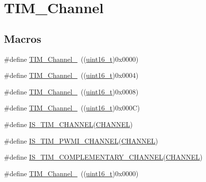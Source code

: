 \hypertarget{group___t_i_m___channel}{}\section{T\+I\+M\+\_\+\+Channel}
\label{group___t_i_m___channel}
\subsection*{Macros}
\begin{DoxyCompactItemize}
\item 
\#define \hyperlink{group___t_i_m___channel_ga69ea7f558f02c63dd1082d784d2449bd}{T\+I\+M\+\_\+\+Channel\+\_}~((\hyperlink{_p_e___types_8h_a1f1825b69244eb3ad2c7165ddc99c956}{uint16\+\_\+t})0x0000)
\item 
\#define \hyperlink{group___t_i_m___channel_ga03d7da8269a87a560f68985b4bd80931}{T\+I\+M\+\_\+\+Channel\+\_}~((\hyperlink{_p_e___types_8h_a1f1825b69244eb3ad2c7165ddc99c956}{uint16\+\_\+t})0x0004)
\item 
\#define \hyperlink{group___t_i_m___channel_ga012711b19e8c91f6f352801a3dc0bcc9}{T\+I\+M\+\_\+\+Channel\+\_}~((\hyperlink{_p_e___types_8h_a1f1825b69244eb3ad2c7165ddc99c956}{uint16\+\_\+t})0x0008)
\item 
\#define \hyperlink{group___t_i_m___channel_ga7414888c40d066af235bc1f80b99bd9d}{T\+I\+M\+\_\+\+Channel\+\_}~((\hyperlink{_p_e___types_8h_a1f1825b69244eb3ad2c7165ddc99c956}{uint16\+\_\+t})0x000\+C)
\item 
\#define \hyperlink{group___t_i_m___channel_gae9721e3731e5fd983c83a9c1d32ef03d}{I\+S\+\_\+\+T\+I\+M\+\_\+\+C\+H\+A\+N\+N\+EL}(\hyperlink{samr21__xpro_200std__low__power__mode_200std__low__power__mode_8c_ace6a11e892466500d47d1f45f042bc53}{C\+H\+A\+N\+N\+EL})
\item 
\#define \hyperlink{group___t_i_m___channel_gacbf272b7a14f63b38bdbf18577835dce}{I\+S\+\_\+\+T\+I\+M\+\_\+\+P\+W\+M\+I\+\_\+\+C\+H\+A\+N\+N\+EL}(\hyperlink{samr21__xpro_200std__low__power__mode_200std__low__power__mode_8c_ace6a11e892466500d47d1f45f042bc53}{C\+H\+A\+N\+N\+EL})
\item 
\#define \hyperlink{group___t_i_m___channel_ga6f44459b7dfc4138bbc2c3795311c48c}{I\+S\+\_\+\+T\+I\+M\+\_\+\+C\+O\+M\+P\+L\+E\+M\+E\+N\+T\+A\+R\+Y\+\_\+\+C\+H\+A\+N\+N\+EL}(\hyperlink{samr21__xpro_200std__low__power__mode_200std__low__power__mode_8c_ace6a11e892466500d47d1f45f042bc53}{C\+H\+A\+N\+N\+EL})
\item 
\#define \hyperlink{group___t_i_m___channel_ga69ea7f558f02c63dd1082d784d2449bd}{T\+I\+M\+\_\+\+Channel\+\_}~((\hyperlink{_p_e___types_8h_a1f1825b69244eb3ad2c7165ddc99c956}{uint16\+\_\+t})0x0000)

\end{DoxyCompactItemize}

